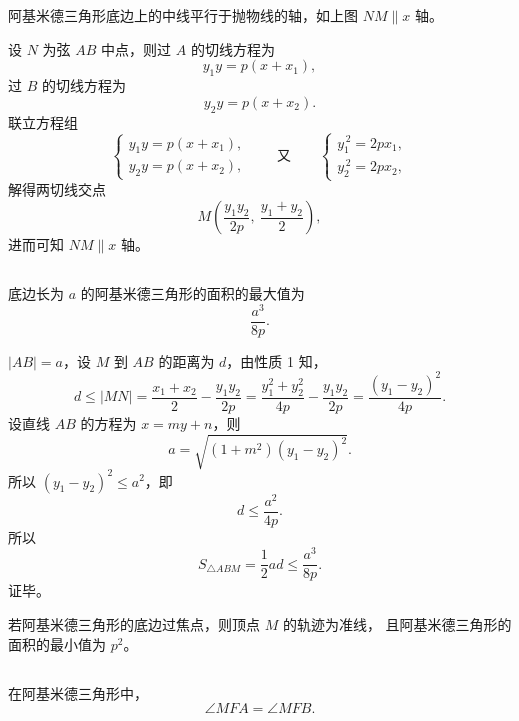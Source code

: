 \documentclass[UTF8]{ctexart}
\begin{document}
	\section*{\color{purple}{主要性质：}}
	
	\subsection*{\color{green!60!black}{性质 1}}
	阿基米德三角形底边上的中线平行于抛物线的轴，如上图 $NM\parallel x$ 轴。
	
	\textbf{\color{red}{证明：}}
	设 $N$ 为弦 $AB$ 中点，则过 $A$ 的切线方程为
	\[
	y_1y=p(x+x_1),
	\]
	过 $B$ 的切线方程为
	\[
	y_2y=p(x+x_2).
	\]
	联立方程组
	\[
	\begin{cases}
		y_1y=p(x+x_1),\\
		y_2y=p(x+x_2),
	\end{cases}
	\qquad \text{又}\qquad
	\begin{cases}
		y_1^{\,2}=2px_1,\\
		y_2^{\,2}=2px_2,
	\end{cases}
	\]
	解得两切线交点
	\[
	M\!\left(\dfrac{y_1y_2}{2p},\ \dfrac{y_1+y_2}{2}\right),
	\]
	进而可知 $NM\parallel x$ 轴。
	
	\subsection*{\color{green!60!black}{性质 2}}
	底边长为 $a$ 的阿基米德三角形的面积的最大值为
	\[
	\frac{a^3}{8p}.
	\]
	
	\textbf{\color{red}{证明：}}
	$|AB|=a$，设 $M$ 到 $AB$ 的距离为 $d$，由性质 1 知，
	\[
	d\le |MN|
	=\frac{x_1+x_2}{2}-\frac{y_1y_2}{2p}
	=\frac{y_1^2+y_2^2}{4p}-\frac{y_1y_2}{2p}
	=\frac{(y_1-y_2)^2}{4p}.
	\]
	设直线 $AB$ 的方程为 $x=my+n$，则
	\[
	a=\sqrt{(1+m^2)(y_1-y_2)^2}.
	\]
	所以 $(y_1-y_2)^2\le a^2$，即
	\[
	d\le \frac{a^2}{4p}.
	\]
	所以
	\[
	S_{\triangle ABM}=\frac12ad\le \frac{a^3}{8p}.
	\]
	证毕。
	
	\textbf{\color{red}{特别地：}}
	若阿基米德三角形的底边过焦点，则顶点 $M$ 的轨迹为准线，
	且阿基米德三角形的面积的最小值为 $p^2$。
	
	\subsection*{\color{green!60!black}{性质 3}}
	在阿基米德三角形中，
	\[
	\angle MFA=\angle MFB.
	\]
	
\end{document}
